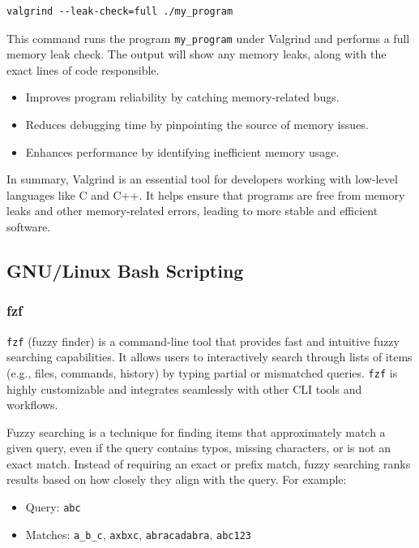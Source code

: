 \documentclass{article}
\newcounter{subsubsubsection}[subsubsection]
\begin{document}
\begin{verbatim}
valgrind --leak-check=full ./my_program
\end{verbatim}
This command runs the program \texttt{my\_program} under Valgrind and performs a full memory leak check. The output will show any memory leaks, along with the exact lines of code responsible.

\begin{itemize}
  \item Improves program reliability by catching memory-related bugs.
  \item Reduces debugging time by pinpointing the source of memory issues.
  \item Enhances performance by identifying inefficient memory usage.
\end{itemize}

In summary, Valgrind is an essential tool for developers working with low-level languages like C and C++. It helps ensure that programs are free from memory leaks and other memory-related errors, leading to more stable and efficient software.

\subsection{GNU/Linux Bash Scripting}
\subsubsection{fzf}

\texttt{fzf} (fuzzy finder) is a command-line tool that provides fast and intuitive fuzzy searching capabilities. It allows users to interactively search through lists of items (e.g., files, commands, history) by typing partial or mismatched queries. \texttt{fzf} is highly customizable and integrates seamlessly with other CLI tools and workflows.


Fuzzy searching is a technique for finding items that approximately match a given query, even if the query contains typos, missing characters, or is not an exact match. Instead of requiring an exact or prefix match, fuzzy searching ranks results based on how closely they align with the query. For example:

\begin{itemize}
    \item Query: \texttt{abc}
    \item Matches: \texttt{a\_b\_c}, \texttt{axbxc}, \texttt{abracadabra}, \texttt{abc123}
\end{itemize}
\end{document}
